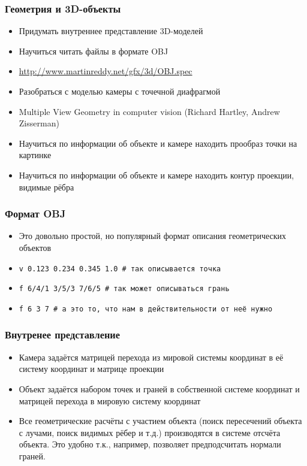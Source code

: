 \begin{frame}\frametitle{Геометрия и 3D-объекты}
    \begin{itemize}
        \item Придумать внутреннее представление 3D-моделей
        \pause
        \item Научиться читать файлы в формате OBJ
        \item \url{http://www.martinreddy.net/gfx/3d/OBJ.spec}
        \pause
        \item Разобраться с моделью камеры с точечной диафрагмой
        \item Multiple View Geometry in computer vision (Richard Hartley, Andrew Zisserman)
        \pause
        \item Научиться по информации об объекте и камере находить прообраз точки на картинке
        \pause
        \item Научиться по информации об объекте и камере находить контур проекции, видимые рёбра
    \end{itemize}
\end{frame}

\begin{frame}\frametitle{Формат OBJ}
    \begin{itemize}
        \item Это довольно простой, но популярный формат описания геометрических объектов
        \pause
        \item \texttt{v 0.123 0.234 0.345 1.0 \# так описывается точка}
        \item \texttt{f 6/4/1 3/5/3 7/6/5 \# так может описываться грань}
        \item \texttt{f 6 3 7 \# а это то, что нам в действительности от неё нужно}
    \end{itemize}
\end{frame}

\begin{frame}\frametitle{Внутренее представление}
    \begin{itemize}
        \item Камера задаётся матрицей перехода из мировой системы координат в её систему координат и матрице проекции
        \pause
        \item Объект задаётся набором точек и граней в собственной системе координат и матрицей перехода в мировую систему координат
        \item Все геометрические расчёты с участием объекта (поиск пересечений объекта с лучами, поиск видимых рёбер и т.д.) производятся в системе отсчёта объекта. Это удобно т.к., например, позволяет предподсчитать нормали граней.
    \end{itemize}
\end{frame}

